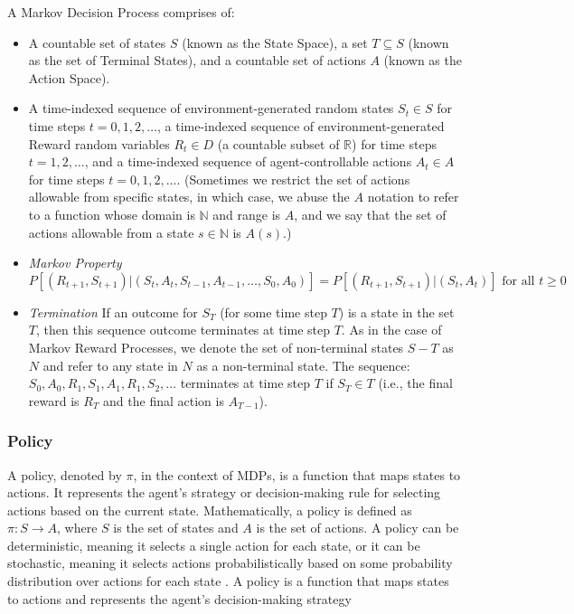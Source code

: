 \documentclass[../xlapes02]{subfiles}
\begin{document}
    \begin{definition}
        A Markov Decision Process comprises of:
        \begin{itemize}
            \item A countable set of states $S$ (known as the State Space), a set $T \subseteq S$ (known as the set of Terminal States), and a countable set of actions $A$ (known as the Action Space).
            \item A time-indexed sequence of environment-generated random states $S_t \in S$ for time steps $t = 0, 1, 2, \ldots$, a time-indexed sequence of environment-generated Reward random variables $R_t \in D$ (a countable subset of $\mathbb{R}$) for time steps $t = 1, 2, \ldots$, and a time-indexed sequence of agent-controllable actions $A_t \in A$ for time steps $t = 0, 1, 2, \ldots$. (Sometimes we restrict the set of actions allowable from specific states, in which case, we abuse the $A$ notation to refer to a function whose domain is $\mathbb{N}$ and range is $A$, and we say that the set of actions allowable from a state $s \in \mathbb{N}$ is $A(s)$.)
            \item \emph{Markov Property}
            \[
                P[(R_{t+1}, S_{t+1})|(S_t, A_t, S_{t-1}, A_{t-1}, \ldots , S_0, A_0)] = P[(R_{t+1}, S_{t+1})|(S_t, A_t)] \text{ for all } t \geq 0
            \]
            \item \emph{Termination} If an outcome for $S_T$ (for some time step $T$) is a state in the set $T$, then this sequence outcome terminates at time step $T$. As in the case of Markov Reward Processes, we denote the set of non-terminal states $S - T$ as $N$ and refer to any state in $N$ as a non-terminal state. The sequence: $S_0, A_0, R_1, S_1, A_1, R_1, S_2, \ldots$ terminates at time step $T$ if $S_T \in T$ (i.e., the final reward is $R_T$ and the final action is $A_{T-1}$).
        \end{itemize}
    \end{definition}

    \subsubsection{Policy}\label{subsubsec:policy}
    A policy, denoted by $\pi$, in the context of MDPs, is a function that maps states to actions. It represents the agent's strategy or decision-making rule for selecting actions based on the current state. Mathematically, a policy is defined as $\pi: S \rightarrow A$, where $S$ is the set of states and $A$ is the set of actions. A policy can be deterministic, meaning it selects a single action for each state, or it can be stochastic, meaning it selects actions probabilistically based on some probability distribution over actions for each state \cite{GPT3.5}. A policy is a function that maps states to actions and represents the agent's decision-making strategy
\end{document}
